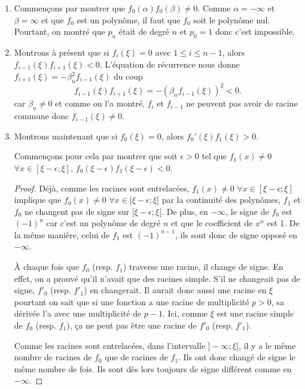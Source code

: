 \documentclass{article}
\begin{document}
\begin{enumerate}
  \item Commençons par montrer que $f_0(\alpha)f_0(\beta) \neq 0$.
    Comme $\alpha = -\infty$ et $\beta = \infty$ et que $f_0$ est un polynôme,
    il faut que $f_0$ soit le polynôme nul.
    Pourtant, on montré que $p_n$ était de degré $n$ et $p_0 = 1$ donc
    c'est impossible.
  \item Montrons à présent que si $f_i(\xi) = 0$ avec $1 \leq i \leq n-1$,
    alors $f_{i-1}(\xi)f_{i+1}(\xi) < 0$.
    L'équation de récurrence nous donne
    $f_{i+1}(\xi) = -\beta_n^2f_{i-1}(\xi)$ du coup
    \[ f_{i-1}(\xi)f_{i+1}(\xi) = -(\beta_nf_{i-1}(\xi))^2 < 0. \]
    car $\beta_n \neq 0$ et comme on l'a montré, $f_i$ et $f_{i-1}$ ne peuvent
    pas avoir de racine commune donc $f_{i-1}(\xi) \neq 0$.
  \item Montrons maintenant que si $f_0(\xi) = 0$,
    alors $f_0'(\xi)f_1(\xi) > 0$.

    Commençons pour cela par montrer que
    soit $\epsilon > 0$ tel que
    $f_1(x) \neq 0$ $\forall x \in [\xi - \epsilon; \xi]$,
    $f_0(\xi-\epsilon) f_1(\xi-\epsilon) < 0$.

    \begin{proof}
      Déjà, comme les racines sont entrelacées,
      $f_1(x) \neq 0$ $\forall x \in [\xi - \epsilon; \xi]$ implique que
      $f_0(x) \neq 0$ $\forall x \in [\xi - \epsilon; \xi[$
      par la continuité des polynômes, $f_1$ et $f_0$ ne changent pas
      de signe sur $[\xi - \epsilon; \xi[$.
      De plus, en $-\infty$,
      le signe de $f_0$ est $(-1)^n$ car c'est un polynôme de
      degré $n$ et que le coefficient de $x^n$ est 1.
      De la même manière, celui de $f_1$ est $(-1)^{n-1}$,
      ils sont donc de signe opposé en $-\infty$.

      À chaque fois que $f_0$ (resp. $f_1$) traverse une racine, il change
      de signe.
      En effet, on a prouvé qu'il n'avait que des racines simple.
      S'il ne changeait pas de signe, $f'_0$ (resp. $f'_1$) en changerait.
      Il aurait donc aussi une racine en $\xi$ pourtant on sait que si une
      fonction a une racine de multiplicité $p > 0$, sa
      dérivée l'a avec une multiplicité de $p-1$.
      Ici, comme $\xi$ est une racine simple de $f_0$ (resp. $f_1$), ça ne peut
      pas être une racine de $f'_0$ (resp. $f'_1$).

      Comme les racines sont entrelacées, dans l'intervalle
      $]-\infty; \xi[$, il y a le même nombre de racines de $f_0$ que de
      racines de $f_1$.
      Ils ont donc changé de signe le même nombre de fois.
      Ils sont dès lors toujours de signe différent comme en $-\infty$.
    \end{proof}


\end{enumerate}
\end{document}
